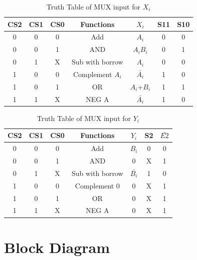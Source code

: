 \documentclass[11pt]{article}
\begin{document}
\begin{table}[ht]
    \centering
    \begin{tabular}{|c|c|c|c|c|c|c|}
        \hline
        CS2 & CS1 & CS0 & Functions & $X_i$ & S11 & S10 \\
        \hline
        0 & 0 & 0 & Add & $A_i$ & 0 & 0 \\
        \hline
        0 & 0 & 1 & AND & $A_iB_i$ & 0 & 1 \\
        \hline
        0 & 1 & X & Sub with borrow & $A_i$ & 0 & 0 \\
        \hline
        1 & 0 & 0 & Complement $A_i$ & $\bar{A_i}$ & 1 & 0 \\
        \hline
        1 & 0 & 1 & OR & $A_i$+$B_i$ & 1 & 1 \\
        \hline
        1 & 1 & X & NEG A & $\bar{A_i}$ & 1 & 0 \\
        \hline
    \end{tabular}
    \caption{Truth Table of MUX input for $X_i$}
    \label{table_xi}
\end{table}
\newpage

\begin{table}[ht]
    \centering
    \begin{tabular}{|c|c|c|c|c|c|c|}
        \hline
        CS2 & CS1 & CS0 & Functions & $Y_i$ & S2 & $\bar{E2}$ \\
        \hline
        0 & 0 & 0 & Add & $B_i$ & 0 & 0 \\
        \hline
        0 & 0 & 1 & AND & 0 & X & 1 \\
        \hline
        0 & 1 & X & Sub with borrow & $\bar{B_i}$ & 1 & 0 \\
        \hline
        1 & 0 & 0 & Complement 0 & 0 & X & 1 \\
        \hline
        1 & 0 & 1 & OR & 0 & X & 1 \\
        \hline
        1 & 1 & X & NEG A & 0 & X & 1 \\
        \hline
    \end{tabular}
    \caption{Truth Table of MUX input for $Y_i$}
    \label{table_yi}
\end{table}

\section{Block Diagram}
\end{document}

